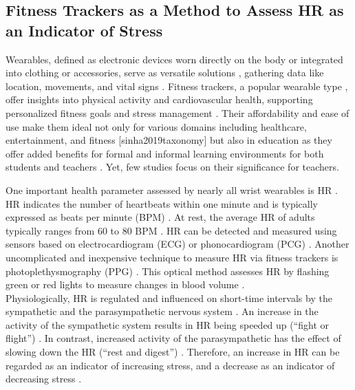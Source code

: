 \documentclass[preprint, 3p,
authoryear]{elsarticle} %
\begin{document}
\subsection{Fitness Trackers as a Method to Assess HR as an Indicator of
Stress}\label{fitness-trackers-as-a-method-to-assess-hr-as-an-indicator-of-stress}

Wearables, defined as electronic devices worn directly on the body or
integrated into clothing or accessories, serve as versatile solutions
\citep{godfrey2018z}, gathering data like location, movements, and vital
signs \citep{cheng2017underlying}. Fitness trackers, a popular wearable
type \citep{park2020user}, offer insights into physical activity and
cardiovascular health, supporting personalized fitness goals
\citep{nuss2021effects} and stress management \citep{hao2018chrv}. Their
affordability and ease of use make them ideal not only for various
domains including healthcare, entertainment, and fitness
{[}sinha2019taxonomy{]} but also in education as they offer added
benefits for formal and informal learning environments for both students
and teachers \citep{de2017towards}. Yet, few studies focus on their
significance for teachers.

One important health parameter assessed by nearly all wrist wearables is
HR \citep{scalise2018wearables}. HR indicates the number of heartbeats
within one minute and is typically expressed as beats per minute (BPM)
\citep{hottenrott2007}. At rest, the average HR of adults typically
ranges from 60 to 80 BPM \citep{sammito2015guideline}. HR can be
detected and measured using sensors based on electrocardiogram (ECG) or
phonocardiogram (PCG) \citep{mukhopadhyay2017wearable}. Another
uncomplicated and inexpensive technique to measure HR via fitness
trackers is photoplethysmography (PPG) \citep{castaneda2018review}. This
optical method assesses HR by flashing green or red lights to measure
changes in blood volume \citep{allen2007photoplethysmography}.\\
Physiologically, HR is regulated and influenced on short-time intervals
by the sympathetic and the parasympathetic nervous system
\citep{pham2021}. An increase in the activity of the sympathetic system
results in HR being speeded up (``fight or flight'')
\citep{taelman2009influence}. In contrast, increased activity of the
parasympathetic has the effect of slowing down the HR (``rest and
digest'') \citep{battipaglia2015}. Therefore, an increase in HR can be
regarded as an indicator of increasing stress, and a decrease as an
indicator of decreasing stress \citep{kyriacou1978}.
\end{document}
